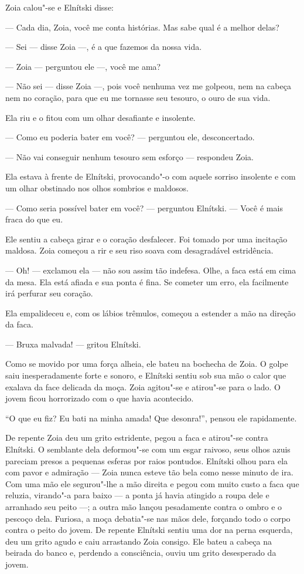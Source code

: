 Zoia calou"-se e Elnítski disse:

--- Cada dia, Zoia, você me conta histórias. Mas sabe qual é a melhor
delas?

--- Sei --- disse Zoia ---, é a que fazemos da nossa vida.

--- Zoia --- perguntou ele ---, você me ama?

--- Não sei --- disse Zoia ---, pois você nenhuma vez me golpeou, nem na
cabeça nem no coração, para que eu me tornasse seu tesouro, o ouro de
sua vida.

Ela riu e o fitou com um olhar desafiante e insolente.

--- Como eu poderia bater em você? --- perguntou ele, desconcertado.

--- Não vai conseguir nenhum tesouro sem esforço --- respondeu Zoia.

Ela estava à frente de Elnítski, provocando"-o com aquele sorriso
insolente e com um olhar obstinado nos olhos sombrios e maldosos.

--- Como seria possível bater em você? --- perguntou Elnítski. --- Você
é mais fraca do que eu.

Ele sentiu a cabeça girar e o coração desfalecer. Foi tomado por uma
incitação maldosa. Zoia começou a rir e seu riso soava com desagradável
estridência.

--- Oh! --- exclamou ela --- não sou assim tão indefesa. Olhe, a faca
está em cima da mesa. Ela está afiada e sua ponta é fina. Se cometer um
erro, ela facilmente irá perfurar seu coração.

Ela empalideceu e, com os lábios trêmulos, começou a estender a mão na
direção da faca.

--- Bruxa malvada! --- gritou Elnítski.

Como se movido por uma força alheia, ele bateu na bochecha de Zoia. O
golpe saiu inesperadamente forte e sonoro, e Elnítski sentiu sob sua mão
o calor que exalava da face delicada da moça. Zoia agitou"-se e atirou"-se
para o lado. O jovem ficou horrorizado com o que havia acontecido.

``O que eu fiz? Eu bati na minha amada! Que desonra!'', pensou ele
rapidamente.

De repente Zoia deu um grito estridente, pegou a faca e atirou"-se contra
Elnítski. O semblante dela deformou"-se com um esgar raivoso, seus olhos
azuis pareciam presos a pequenas esferas por raios pontudos. Elnítski
olhou para ela com pavor e admiração --- Zoia nunca esteve tão bela como
nesse minuto de ira. Com uma mão ele segurou"-lhe a mão direita e pegou com muito custo a faca que reluzia, virando"-a para baixo --- a
ponta já havia atingido a roupa dele e arranhado seu peito ---; a outra
mão lançou pesadamente contra o ombro e o pescoço dela. Furiosa, a
moça debatia"-se nas mãos dele, forçando todo o corpo contra o peito do
jovem. De repente Elnítski sentiu uma dor na perna esquerda, deu um
grito agudo e caiu arrastando Zoia consigo. Ele bateu a cabeça na
beirada do banco e, perdendo a consciência, ouviu um grito desesperado
da jovem.

